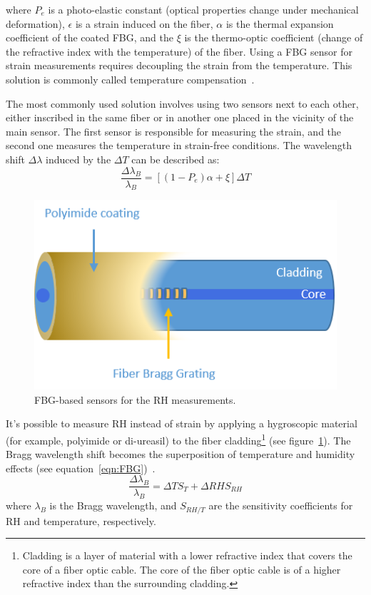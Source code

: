 where $P_{e}$ is a photo-elastic constant (optical properties change under mechanical deformation), $\epsilon$ is a strain induced on the fiber, $\alpha$ is the thermal expansion coefficient of the coated \gls{FBG}, and the $\xi$ is the thermo-optic coefficient (change of the refractive index with the temperature) of the fiber. Using a \gls{FBG} sensor for strain measurements requires decoupling the strain from the temperature. This solution is commonly called temperature compensation~\cite{Yun-Jiang_Rao_1997}. 

The most commonly used solution involves using two sensors next to each other, either inscribed in the same fiber or in another one placed in the vicinity of the main sensor. The first sensor is responsible for measuring the strain, and the second one measures the temperature in strain-free conditions. The wavelength shift $\Delta \lambda$ induced by the $\Delta T$ can be described as:
\begin{equation}
    \frac{\Delta\lambda_{B}}{\lambda_{B}}=\left [(1-P_{e}) \alpha + \xi  \right ] \Delta T
\end{equation}


\begin{figure}[!h]
\centering
\includegraphics[width=0.45\columnwidth]{Chapter5/images/Picture1.png}
\caption{FBG-based sensors for the RH measurements.}
\label{fig:fbg_scheme}
\end{figure}


It's possible to measure RH instead of strain by applying a hygroscopic material (for example, polyimide or di-ureasil) to the fiber cladding\footnote{Cladding is a layer of material with a lower refractive index that covers the core of a fiber optic cable. The core of the fiber optic cable is of a higher refractive index than the surrounding cladding.} (see figure~\ref{fig:fbg_scheme}). The Bragg wavelength shift becomes the superposition of temperature and humidity effects (see equation~\ref{eqn:FBG})~\cite{Kronenberg:02, YEO_PI}. 
                             \begin{equation}\label{eqn:FBG}
                                    \frac{\Delta\lambda_{B}}{\lambda_{B}}=\Delta TS_{T}+\Delta RHS_{RH}
                            \end{equation}
                            where $\lambda_{B}$ is the Bragg wavelength, and $S_{RH/T}$ are the sensitivity coefficients for RH and temperature, respectively. 

